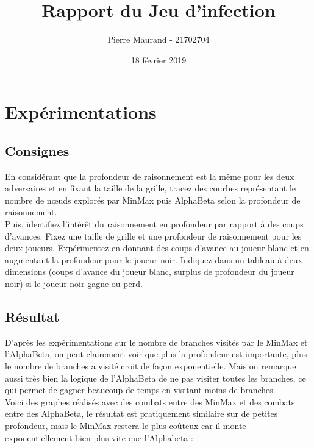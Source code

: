 \documentclass[a4paper, 11pt]{article}
\title{Rapport du Jeu d’infection}
\author{Pierre Maurand - 21702704}
\date{18 février 2019}
\begin{document}
\maketitle

\thispagestyle{empty}
\setcounter{page}{0}

\newpage
\tableofcontents
\newpage

\section{Expérimentations}
\subsection{Consignes}
\hspace{\parindent}
En considérant que la profondeur de raisonnement est la même pour les deux adversaires et en fixant la taille de la grille, tracez des courbes représentant le nombre de nœuds explorés par MinMax puis AlphaBeta selon la profondeur de raisonnement.\\

Puis, identifiez l’intérêt du raisonnement en profondeur par rapport à des coups d’avances. Fixez une taille de grille et une profondeur de raisonnement pour les deux joueurs. Expérimentez en donnant des coups d’avance au joueur blanc et en augmentant la profondeur pour le joueur noir. Indiquez dans un tableau à deux dimensions (coups d’avance du joueur blanc, surplus de profondeur du joueur noir) si le joueur noir gagne ou perd.

\subsection{Résultat}
\hspace{\parindent}
D'après les expérimentations sur le nombre de branches visités par le MinMax et l'AlphaBeta, on peut clairement voir que plus la profondeur est importante, plus le nombre de branches a visité croit de façon exponentielle. Mais on remarque aussi très bien la logique de l'AlphaBeta de ne pas visiter toutes les branches, ce qui permet de gagner beaucoup de temps en visitant moins de branches.\\

Voici des graphes réalisés avec des combats entre des MinMax et des combats entre des AlphaBeta, le résultat est pratiquement similaire sur de petites profondeur, mais le MinMax restera le plus coûteux car il monte exponentiellement bien plus vite que l'Alphabeta :\\
\end{document}
